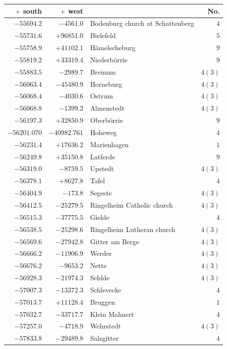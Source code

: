 \clearpage{}%
\begin{center}\begingroup\fontsize{8}{9}\selectfont
\setlength{\tabcolsep}{4pt}
\begin{tabular}{r|r|p{170pt}|r}\hline
\(+\) south&\(+\) west&&No.\\\hline
\(-55694.2\)&\(-4561.0\)&Bodenburg church at Schattenberg&\(4\)\\
\(-55731.6\)&\(+96851.0\)&Bielefeld&\(5\)\\
\(-55758.9\)&\(+41102.1\)&Hämelscheburg&\(9\)\\
\(-55819.2\)&\(+33319.4\)&Niederbörrie&\(9\)\\
\(-55883.5\)&\(-2989.7\)&Breinum&\(4 (3)\)\\
\(-56063.4\)&\(-45480.9\)&Horneburg&\(4 (3)\)\\
\(-56068.4\)&\(-4030.6\)&Ostrum&\(4 (3)\)\\
\(-56068.8\)&\(-1399.2\)&Almenstedt&\(4 (3)\)\\
\(-56197.3\)&\(+32850.9\)&Oberbörrie&\(9\)\\
\(-56201.070\)&\(-40982.761\)&Hoheweg&\(4\)\\
\(-56231.4\)&\(+17636.2\)&Marienhagen&\(1\)\\
\(-56249.8\)&\(+35150.8\)&Latferde&\(9\)\\
\(-56319.0\)&\(-8759.5\)&Upstedt&\(4 (3)\)\\
\(-56378.1\)&\(+8627.8\)&Tafel&\(4\)\\
\(-56404.9\)&\(-173.8\)&Segeste&\(4 (3)\)\\
\(-56412.5\)&\(-25279.5\)&Ringelheim Catholic church&\(4 (3)\)\\
\(-56515.3\)&\(-37775.5\)&Gielde&\(4\)\\
\(-56538.5\)&\(-25298.6\)&Ringelheim Lutheran church&\(4 (3)\)\\
\(-56569.6\)&\(-27942.8\)&Gitter am Berge&\(4 (3)\)\\
\(-56666.2\)&\(-11906.9\)&Werder&\(4 (3)\)\\
\(-56676.2\)&\(-9653.2\)&Nette&\(4 (3)\)\\
\(-56928.3\)&\(-21974.3\)&Sehlde&\(4 (3)\)\\
\(-57007.3\)&\(-13372.3\)&Schlevecke&\(4\)\\
\(-57013.7\)&\(+11128.4\)&Bruggen&\(1\)\\
\(-57032.7\)&\(-33717.7\)&Klein Mahnert&\(4\)\\
\(-57257.0\)&\(-4718.9\)&Wehrstedt&\(4 (3)\)\\
\(-57833.8\)&\(-29489.8\)&Salzgitter&\(4\)\\

\end{tabular}
\end{center}
